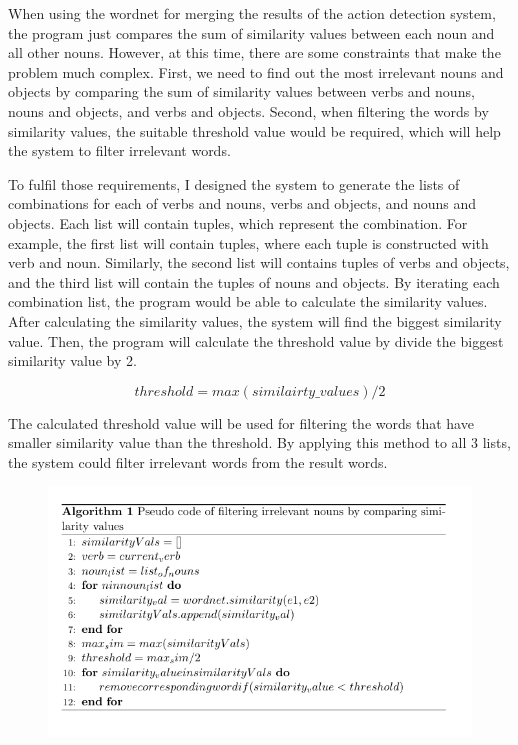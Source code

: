 \documentclass{article}
\begin{document}
When using the wordnet for merging the results of the action detection system, the program just compares the sum of similarity values between each noun and all other nouns. However, at this time, there are some constraints that make the problem much complex. First, we need to find out the most irrelevant nouns and objects by comparing the sum of similarity values between verbs and nouns, nouns and objects, and verbs and objects. Second, when filtering the words by similarity values, the suitable threshold value would be required, which will help the system to filter irrelevant words.

To fulfil those requirements, I designed the system to generate the lists of combinations for each of verbs and nouns, verbs and objects, and nouns and objects. Each list will contain tuples, which represent the combination. For example, the first list will contain tuples, where each tuple is constructed with verb and noun. Similarly, the second list will contains tuples of verbs and objects, and the third list will contain the tuples of nouns and objects. By iterating each combination list, the program would be able to calculate the similarity values. After calculating the similarity values, the system will find the biggest similarity value. Then, the program will calculate the threshold value by divide the biggest similarity value by 2.

\[threshold = max(similairty\_values) / 2\]

The calculated threshold value will be used for filtering the words that have smaller similarity value than the threshold. By applying this method to all 3 lists, the system could filter irrelevant words from the result words.

\begin{figure}[H]
    \centering
    \includegraphics[scale=1]{imgs/pseudo_code.png}
    \label{fig:pseudocode_merging}
\end{figure}
\end{document}
